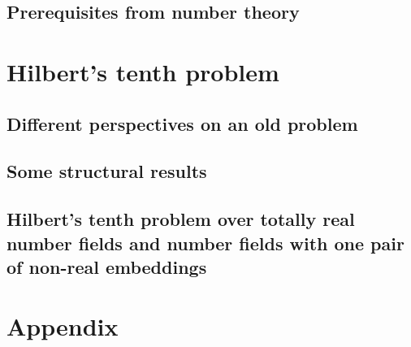 \documentclass[12pt, a4paper, numbers=noenddot]{scrbook}
\numberwithin{equation}{section}
\begin{document}
\section{Prerequisites from number theory}\label{sec:number theory}


\chapter{Hilbert's tenth problem}

\section{Different perspectives on an old problem}


\section{Some structural results}


\section[\textsc{H10} over totally real number fields and fields with one  pair
         of conjugate embeddings]
        {Hilbert's tenth problem over totally real number fields and number
         fields with one pair of non-real embeddings}


% 

% 

\clearpage
\appendix

\chapter{Appendix}\label{sec:Appendix}


\backmatter
\vspace{\fill}
\printbibliography

\listoftodos
\end{document}
